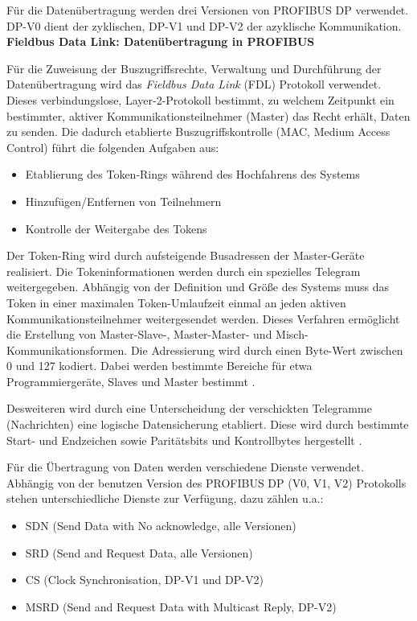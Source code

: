 Für die Datenübertragung werden drei Versionen von PROFIBUS DP verwendet. DP-V0 dient der zyklischen, DP-V1 und DP-V2 der azyklische Kommunikation.\\

\textbf{Fieldbus Data Link: Datenübertragung in PROFIBUS}

Für die Zuweisung der Buszugriffsrechte, Verwaltung und Durchführung der Datenübertragung wird das \textit{Fieldbus Data Link} (FDL) Protokoll verwendet. Dieses verbindungslose, Layer-2-Protokoll bestimmt, zu welchem Zeitpunkt ein bestimmter, aktiver Kommunikationsteilnehmer (Master) das Recht erhält, Daten zu senden. Die dadurch etablierte Buszugriffskontrolle (MAC, Medium Access Control) führt die folgenden Aufgaben aus:
\begin{itemize}
\item Etablierung des Token-Rings während des Hochfahrens des Systems
\item Hinzufügen/Entfernen von Teilnehmern
\item Kontrolle der Weitergabe des Tokens
\end{itemize}
\citep{Profibus2}

Der Token-Ring wird durch aufsteigende Busadressen der Master-Geräte realisiert. Die Tokeninformationen werden durch ein spezielles Telegram weitergegeben. Abhängig von der Definition und Größe des Systems muss das Token in einer maximalen Token-Umlaufzeit einmal an jeden aktiven Kommunikationsteilnehmer weitergesendet werden. Dieses Verfahren ermöglicht die Erstellung von Master-Slave-, Master-Master- und Misch-Kommunikationsformen. Die Adressierung wird durch einen Byte-Wert zwischen 0 und 127 kodiert. Dabei werden bestimmte Bereiche für etwa Programmiergeräte, Slaves und Master bestimmt \citep{Profibus2}.

Desweiteren wird durch eine Unterscheidung der verschickten Telegramme (Nachrichten) eine logische Datensicherung etabliert. Diese wird durch bestimmte Start- und Endzeichen sowie Paritätsbits und Kontrollbytes hergestellt \citep{Profibus2}.

Für die Übertragung von Daten werden verschiedene Dienste verwendet. Abhängig von der benutzen Version des PROFIBUS DP (V0, V1, V2) Protokolls stehen unterschiedliche Dienste zur Verfügung, dazu zählen u.a.:
\glqq 
\begin{itemize}
\item SDN (Send Data with No acknowledge, alle Versionen)
\item SRD (Send and Request Data, alle Versionen)
\item CS (Clock Synchronisation, DP-V1 und DP-V2)
\item MSRD (Send and Request Data with Multicast Reply, DP-V2)
\end{itemize}
\grqq
\citep{Profibus7} 


